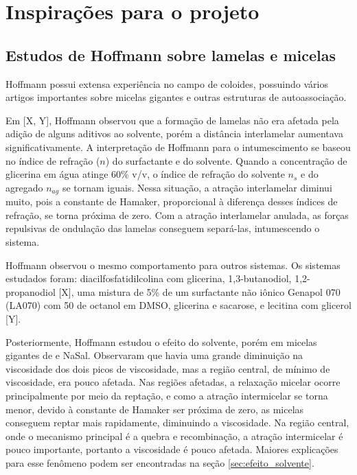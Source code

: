 	
	\chapter{Inspirações para o projeto}
		\section{Estudos de Hoffmann sobre lamelas e micelas}
		Hoffmann possui extensa experiência no campo de coloides, possuindo vários artigos importantes sobre micelas gigantes e outras estruturas de autoassociação.
		
		Em [X, Y], Hoffmann observou que a formação de lamelas não era afetada pela adição de alguns aditivos ao solvente, porém a distância interlamelar aumentava significativamente. A interpretação de Hoffmann para o intumescimento se baseou no índice de refração (\(n\)) do surfactante e do solvente. Quando a concentração de glicerina em água atinge 60\% v/v, o índice de refração do solvente \(n_s\) e do agregado \(n_{ag}\) se tornam iguais. Nessa situação, a atração interlamelar diminui muito, pois a constante de Hamaker, proporcional à diferença desses índices de refração, se torna próxima de zero. Com a atração interlamelar anulada, as forças repulsivas de ondulação das lamelas conseguem separá-las, intumescendo o sistema.
		
		Hoffmann observou o mesmo comportamento para outros sistemas. Os sistemas estudados foram: diacilfosfatidilcolina com glicerina, 1,3-butanodiol, 1,2-propanodiol [X], uma mistura de 5\% de um surfactante não iônico Genapol 070 (LA070) com 50\mM{} de octanol em DMSO, glicerina e sacarose, e lecitina com glicerol [Y].
		
		
		
		Posteriormente, Hoffmann estudou o efeito do solvente, porém em micelas gigantes de \CTAB{} e NaSal. Observaram que havia uma grande diminuição na viscosidade dos dois picos de viscosidade, mas a região central, de mínimo de viscosidade, era pouco afetada. Nas regiões afetadas, a relaxação micelar ocorre principalmente por meio da reptação, e como a atração intermicelar se torna menor, devido à constante de Hamaker ser próxima de zero, as micelas conseguem reptar mais rapidamente, diminuindo a viscosidade. Na região central, onde o mecanismo principal é a quebra e recombinação, a atração intermicelar é pouco importante, portanto a viscosidade é pouco afetada. Maiores explicações para esse fenômeno podem ser encontradas na seção \ref{sec:efeito_solvente}.
		
